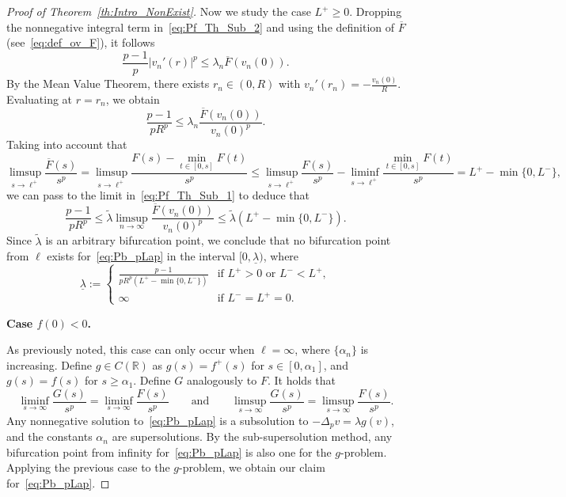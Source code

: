 \documentclass[10pt,twoside,english,reqno,a4paper]{amsart}
\theoremstyle{plain}
\theoremstyle{plain}
\theoremstyle{definition}
\theoremstyle{remark}
\numberwithin{equation}{section}
\newcommand{\R}{\mathbb{R}}
\newcommand{\oF}{\overline{F}}
\newcommand{\oL}{L^+}
\newcommand{\uL}{L^-}
\begin{document}
\begin{proof}[Proof of Theorem~\ref{th:Intro_NonExist}]
Now we study the case $\oL\geq 0$. Dropping the nonnegative integral term in~\eqref{eq:Pf_Th_Sub_2} and using the definition of $\oF$ (see~\eqref{eq:def_ov_F}), it follows
\[
\frac{p-1}{p} |v_n'(r)|^p \leq \lambda_n \oF(v_n(0)).
\]
By the Mean Value Theorem, there exists $r_n\in (0,R)$ with $v_n'(r_n) = -\frac{v_n(0)}{R}$. Evaluating at $r=r_n$, we obtain
\begin{equation}
\label{eq:Pf_Th_Sub_1}
\frac{p-1}{pR^p} \leq \lambda_n \frac{\oF(v_n(0))}{v_n(0)^p}.
\end{equation}
Taking into account that
\[
\limsup_{s\to \ell^+} \frac{\oF(s)}{s^p} = \limsup_{s\to \ell^+} \frac{F(s)-\min_{t\in[0,s]} F(t)}{s^p} \leq \limsup_{s\to \ell^+} \frac{F(s)}{s^p} - \liminf_{s\to \ell^+} \frac{\min_{t\in[0,s]} F(t)}{s^p} = \oL - \min\{0,\uL\},
\]
we can pass to the limit in~\eqref{eq:Pf_Th_Sub_1} to deduce that
\begin{equation*}
\frac{p-1}{pR^p} \leq \tilde\lambda \limsup_{n\to\infty} \frac{\oF(v_n(0))}{v_n(0)^p} \leq \tilde\lambda (\oL - \min\{0,\uL\}).
\end{equation*}
Since $\tilde\lambda$ is an arbitrary bifurcation point, we conclude that no bifurcation point from $\ell$ exists for~\eqref{eq:Pb_pLap} in the interval $[0,\underline\lambda)$, where 
\[
\underline{\lambda} :=  \begin{cases}
\frac{p-1}{pR^p (\oL - \min\{0,\uL\})} & \text{if } \oL > 0 \text{ or } \uL < \oL, \\
\infty & \text{if } \uL=\oL = 0.
\end{cases}
\]

\textbf{Case $f(0)<0$.}

As previously noted, this case can only occur when $\ell=\infty$, where $\{\alpha_n\}$ is increasing.
Define $g\in C(\R)$ as $g(s) = f^+(s)$ for $s\in [0,\alpha_1]$, and $g(s) = f(s)$ for $s\geq \alpha_1$. Define $G$ analogously to $F$. It holds that
\[
\liminf_{s\to \infty} \frac{G(s)}{s^p} = \liminf_{s\to \infty} \frac{F(s)}{s^p} \qquad \text{and} \qquad \limsup_{s\to \infty} \frac{G(s)}{s^p} = \limsup_{s\to \infty} \frac{F(s)}{s^p}.
\]
Any nonnegative solution to~\eqref{eq:Pb_pLap} is a subsolution to $-\Delta_p v = \lambda g(v)$, and the constants $\alpha_n$ are supersolutions. By the sub-supersolution method, any bifurcation point from infinity for~\eqref{eq:Pb_pLap} is also one for the $g$-problem. Applying the previous case to the $g$-problem, we obtain our claim for~\eqref{eq:Pb_pLap}.
\end{proof}
\end{document}
